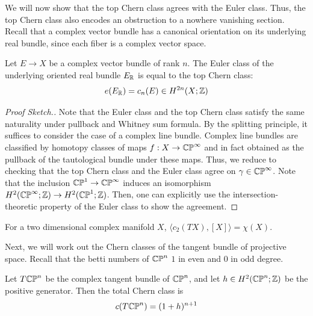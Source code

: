 \documentclass[12pt]{article}
\begin{document}
We will now show that the top Chern class agrees with the Euler class. Thus, the top Chern class also encodes an obstruction to a nowhere vanishing section. Recall that a complex vector bundle has a canonical orientation on its underlying real bundle, since each fiber is a complex vector space.

\begin{theorem}
Let \(E\to X\) be a complex vector bundle of rank \(n\). The Euler class of the underlying oriented real bundle \(E_{\mathbb R}\) is equal to the top Chern class:
\[ e(E_{\mathbb R})=c_n(E)\in H^{2n}(X;\mathbb Z) \]
\end{theorem}

\begin{proof}[Proof Sketch.]
    Note that the Euler class and the top Chern class satisfy the same naturality under pullback and Whitney sum formula. By the splitting principle, it suffices to consider the case of a complex line bundle. Complex line bundles are classified by homotopy classes of maps $f: X \to \mathbb{CP}^\infty$ and in fact obtained as the pullback of the tautological bundle under these maps. Thus, we reduce to checking that the top Chern class and the Euler class agree on $\gamma \in \mathbb{CP}^\infty$. Note that the inclusion $\mathbb{CP}^1 \to \mathbb{CP}^\infty$ induces an isomorphism $H^2(\mathbb{CP}^\infty; \mathbb Z) \to H^2(\mathbb{CP}^1; \mathbb Z)$. Then, one can explicitly use the intersection-theoretic property of the Euler class to show the agreement. 
\end{proof}
\begin{corollary}
    For a two dimensional complex manifold $X$, $\langle c_2(TX), [X] \rangle = \chi(X)$.
\end{corollary}

Next, we will work out the Chern classes of the tangent bundle of projective space. Recall that the betti numbers of $\mathbb{CP}^n$ $1$ in even and $0$ in odd degree. 
\begin{theorem}
    Let $T\mathbb{CP}^n$ be the complex tangent bundle of $\mathbb{CP}^n$, and let $h \in H^2(\mathbb{CP}^n; \mathbb Z)$ be the positive generator. Then the total Chern class is
    \[ c(T\mathbb{CP}^n) = (1+h)^{n+1} \]
\end{theorem}
\end{document}

